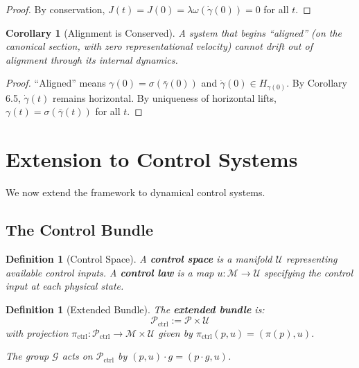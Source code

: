 \documentclass[11pt]{article}
\newtheorem{corollary}[theorem]{Corollary}
\newtheorem{definition}[theorem]{Definition}
\begin{document}
\begin{proof}
By conservation, $J(t) = J(0) = \lambda\omega(\dot{\gamma}(0)) = 0$ for all $t$.
\end{proof}

\begin{corollary}[Alignment is Conserved]
A system that begins ``aligned'' (on the canonical
section, with zero representational velocity) cannot drift out of alignment through its internal
dynamics.
\end{corollary}

\begin{proof}
``Aligned'' means $\gamma(0) = \sigma(\bar{\gamma}(0))$ and $\dot{\gamma}(0) \in H_{\gamma(0)}$. By Corollary 6.5, $\dot{\gamma}(t)$ remains
horizontal. By uniqueness of horizontal lifts, $\gamma(t) = \sigma(\bar{\gamma}(t))$ for all $t$.
\end{proof}

\section{Extension to Control Systems}

We now extend the framework to dynamical control systems.

\subsection{The Control Bundle}

\begin{definition}[Control Space]
A \textbf{control space} is a manifold $\mathcal{U}$ representing available control
inputs. A \textbf{control law} is a map $u : \mathcal{M} \to \mathcal{U}$ specifying the control input at each physical state.
\end{definition}

\begin{definition}[Extended Bundle]
The \textbf{extended bundle} is:
\[
\mathcal{P}_{\mathrm{ctrl}} := \mathcal{P} \times \mathcal{U}
\]
with projection $\pi_{\mathrm{ctrl}} : \mathcal{P}_{\mathrm{ctrl}} \to \mathcal{M} \times \mathcal{U}$ given by $\pi_{\mathrm{ctrl}}(p, u) = (\pi(p), u)$.

The group $\mathcal{G}$ acts on $\mathcal{P}_{\mathrm{ctrl}}$ by $(p, u) \cdot g = (p \cdot g, u)$.
\end{definition}
\end{document}

